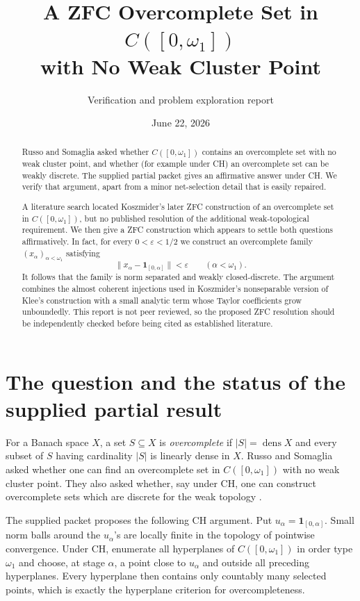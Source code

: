 \documentclass[11pt]{article}
\title{A ZFC Overcomplete Set in $C([0,\omega_1])$\\
with No Weak Cluster Point}
\author{Verification and problem exploration report}
\date{June 22, 2026}
\theoremstyle{remark}
\newcommand{\dens}{\operatorname{dens}}
\newcommand{\one}{\mathbf 1}
\begin{document}
\maketitle

\begin{abstract}
Russo and Somaglia asked whether $C([0,\omega_1])$ contains an overcomplete
set with no weak cluster point, and whether (for example under CH) an
overcomplete set can be weakly discrete.  The supplied partial packet gives an
affirmative answer under CH.  We verify that argument, apart from a minor
net-selection detail that is easily repaired.

A literature search located Koszmider's later ZFC construction of an
overcomplete set in $C([0,\omega_1])$, but no published resolution of the
additional weak-topological requirement.  We then give a ZFC construction
which appears to settle both questions affirmatively.  In fact, for every
$0<\varepsilon<1/2$ we construct an overcomplete family
$(x_\alpha)_{\alpha<\omega_1}$ satisfying
\[
  \bigl\|x_\alpha-\one_{[0,\alpha]}\bigr\|<\varepsilon
  \qquad(\alpha<\omega_1).
\]
It follows that the family is norm separated and weakly closed-discrete.
The argument combines the almost coherent injections used in Koszmider's
nonseparable version of Klee's construction with a small analytic term whose
Taylor coefficients grow unboundedly.  This report is not peer reviewed, so
the proposed ZFC resolution should be independently checked before being
cited as established literature.
\end{abstract}

\section{The question and the status of the supplied partial result}

For a Banach space $X$, a set $S\subseteq X$ is \emph{overcomplete} if
$|S|=\dens X$ and every subset of $S$ having cardinality $|S|$ is linearly
dense in $X$.  Russo and Somaglia asked whether one can find an overcomplete
set in $C([0,\omega_1])$ with no weak cluster point.  They also asked whether,
say under CH, one can construct overcomplete sets which are discrete for the
weak topology \cite[Section 4.1]{RussoSomaglia}.

The supplied packet proposes the following CH argument.  Put
$u_\alpha=\one_{[0,\alpha]}$.  Small norm balls around the $u_\alpha$'s are
locally finite in the topology of pointwise convergence.  Under CH, enumerate
all hyperplanes of $C([0,\omega_1])$ in order type $\omega_1$ and choose, at
stage $\alpha$, a point close to $u_\alpha$ and outside all preceding
hyperplanes.  Every hyperplane then contains only countably many selected
points, which is exactly the hyperplane criterion for overcompleteness.
\end{document}
